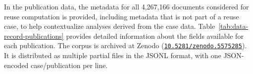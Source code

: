 In the publication data, the metadata for all 4,267,166 documents considered for reuse computation is provided, including metadata that is not part of a reuse case, to help contextualize analyses derived from the case data. Table~\ref{tab:data-record-publications} provides detailed information about the fields available for each publication. The \webisReuseCorpus corpus is archived at Zenodo (\href{http://dx.doi.org/10.5281/zenodo.5575285}{\texttt{10.5281/zenodo.5575285}}\cite{zenodo-metadata}). It is distributed as multiple partial files in the JSONL format, with one JSON-encoded case/publication per line. 

